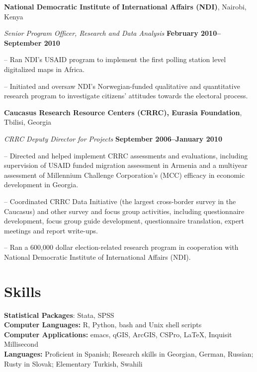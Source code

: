 \documentclass[margin,line]{res}
\newenvironment{list1}{
  \begin{list}{\ding{113}}{%
      \setlength{\itemsep}{0in}
      \setlength{\parsep}{0in} \setlength{\parskip}{0in}
      \setlength{\topsep}{0in} \setlength{\partopsep}{0in} 
      \setlength{\leftmargin}{0.17in}}}{\end{list}}
\begin{document}
{\begin{resume}
{\bf National Democratic Institute of International Affairs (NDI)}, Nairobi, Kenya
\vspace{-.3cm}

{\em Senior Program Officer, Research and Data Analysis} \hfill {\bf
  February 2010--September 2010}\\
\vspace{-.3cm}
\begin{list1} 
\item[]-- Ran NDI's  USAID program to implement the first polling station level
digitalized maps in Africa.
\item[]-- Initiated and oversaw NDI's
Norwegian-funded qualitative and quantitative research program to
investigate citizens' attitudes towards the electoral process.
\end{list1}
{\bf Caucasus Research Resource Centers (CRRC), Eurasia Foundation},
Tbilisi, Georgia

\vspace{-.3cm}
{\em CRRC Deputy Director for Projects} \hfill {\bf
  September 2006--January 2010}\\

\vspace{-.3cm}
\begin{list1} 
\item[]-- Directed and helped implement CRRC assessments and evaluations,
  including supervision of USAID funded migration assessment in
  Armenia and a multiyear assessment of Millennium Challenge
  Corporation's (MCC) efficacy in economic development in
  Georgia. 
\item[]-- Coordinated CRRC Data Initiative (the largest cross-border
  survey in the Caucasus) and other survey and focus group activities,
  including questionnaire development, focus group guide development,
  questionnaire translation, expert meetings and report write-ups. 
\item[]-- Ran a 600,000 dollar election-related research program in
  cooperation with National Democratic Institute of International
  Affairs (NDI).
\end{list1}



\section{\sc Skills} 
\textbf{Statistical Packages}:  Stata, SPSS \\
\textbf{Computer Languages:} R, Python, bash and Unix shell scripts \\
\textbf{Computer Applications:} emacs, qGIS, ArcGIS, CSPro,  \LaTeX,
Inquisit Millisecond \\
\textbf{Languages:} Proficient in Spanish; Research skills in
  Georgian, German, Russian; Rusty in Slovak; Elementary Turkish,
  Swahili \\


\end{resume}}
\end{document}
